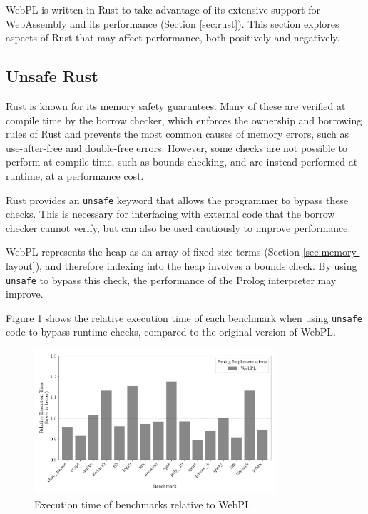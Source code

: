 WebPL is written in Rust to take advantage of its extensive support for WebAssembly and its performance (Section \ref{sec:rust}). This section explores aspects of Rust that may affect performance, both positively and negatively.

\subsection{Unsafe Rust}

Rust is known for its memory safety guarantees. Many of these are verified at compile time by the borrow checker, which enforces the ownership and borrowing rules of Rust and prevents the most common causes of memory errors, such as use-after-free and double-free errors. However, some checks are not possible to perform at compile time, such as bounds checking, and are instead performed at runtime, at a performance cost.

Rust provides an \texttt{unsafe} keyword that allows the programmer to bypass these checks. This is necessary for interfacing with external code that the borrow checker cannot verify, but can also be used cautiously to improve performance.

WebPL represents the heap as an array of fixed-size terms (Section \ref{sec:memory-layout}), and therefore indexing into the heap involves a bounds check. By using \texttt{unsafe} to bypass this check, the performance of the Prolog interpreter may improve.

Figure \ref{fig:unsafe} shows the relative execution time of each benchmark when using \texttt{unsafe} code to bypass runtime checks, compared to the original version of WebPL.

\begin{figure}[H]
\centering
\includegraphics[width=0.8\textwidth]{relative_performance_unsafe.pdf}
\caption{Execution time of benchmarks relative to WebPL}
\label{fig:unsafe}
\end{figure}

